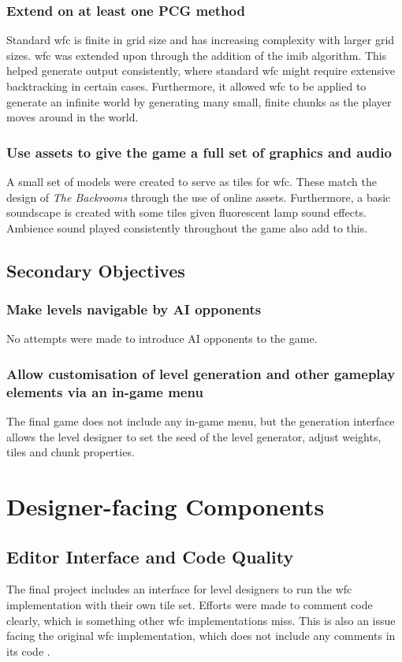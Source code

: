 \subsubsection{Extend on at least one PCG method}
Standard \acrlong{wfc} is finite in grid size and has increasing complexity with larger grid sizes. \acrshort{wfc} was extended upon through the addition of the \acrlong{imib} algorithm. This helped generate output consistently, where standard \acrshort{wfc} might require extensive backtracking in certain cases. Furthermore, it allowed \acrshort{wfc} to be applied to generate an infinite world by generating many small, finite chunks as the player moves around in the world.

\subsubsection{Use assets to give the game a full set of graphics and audio}
A small set of models were created to serve as tiles for \acrshort{wfc}. These match the design of \textit{The Backrooms} through the use of online assets. Furthermore, a basic soundscape is created with some tiles given fluorescent lamp sound effects. Ambience sound played consistently throughout the game also add to this.%

\subsection{Secondary Objectives}
\subsubsection{Make levels navigable by AI opponents}
No attempts were made to introduce AI opponents to the game.

\subsubsection{Allow customisation of level generation and other gameplay elements via an in-game menu}
The final game does not include any in-game menu, but the generation interface allows the level designer to set the seed of the level generator, adjust weights, tiles and chunk properties.

\section{Designer-facing Components}
\subsection{Editor Interface and Code Quality}
The final project includes an interface for level designers to run the \acrshort{wfc} implementation with their own tile set. Efforts were made to comment code clearly, which is something other \acrshort{wfc} implementations miss. This is also an issue facing the original \acrshort{wfc} implementation, which does not include any comments in its code \cite{Gumin_Wave_Function_Collapse_2016}.

